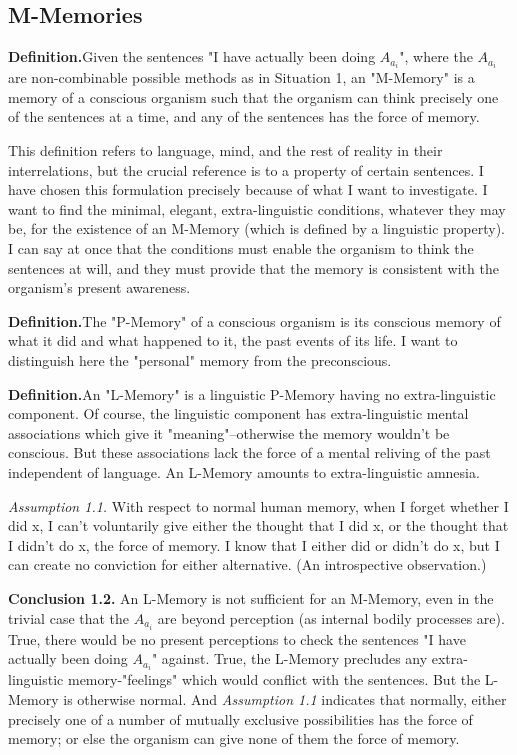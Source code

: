 \documentclass[10pt,twoside]{memoir}
\begin{document}
\begin{enumerate}
{\begin{enumerate}
\begin{sysrules}
\begin{sysrules}
\begin{sysrules}
\begin{sysrules}
\subsection{M-Memories}

\newcommand{\definition}{\textbf{Definition.}}
\newcommand{\assumption}[1]{\textit{Assumption #1.}}
\newcommand{\conclusion}[1]{\textbf{Conclusion #1.}}

\definition Given the sentences "I have actually been doing $A_{a_i}$", where 
the $A_{a_i}$ are non-combinable possible methods as in Situation 1, an 
"M-Memory" is a memory of a conscious organism such that the organism 
can think precisely one of the sentences at a time, and any of the sentences 
has the force of memory. 

This definition refers to language, mind, and the rest of reality in their 
interrelations, but the crucial reference is to a property of certain sentences. 
I have chosen this formulation precisely because of what I want to 
investigate. I want to find the minimal, elegant, extra-linguistic conditions, 
whatever they may be, for the existence of an M-Memory (which is defined 
by a linguistic property). I can say at once that the conditions must enable 
the organism to think the sentences at will, and they must provide that the 
memory is consistent with the organism's present awareness. 

\definition The "P-Memory" of a conscious organism is its conscious 
memory of what it did and what happened to it, the past events of its life. I 
want to distinguish here the "personal" memory from the preconscious. 

\definition An "L-Memory" is a linguistic P-Memory having no 
extra-linguistic component. Of course, the linguistic component has 
extra-linguistic mental associations which give it "meaning"--otherwise the 
memory wouldn't be conscious. But these associations lack the force of a 
mental reliving of the past independent of language. An L-Memory amounts 
to extra-linguistic amnesia. 

\assumption{1.1} With respect to normal human memory, when I forget 
whether I did x, I can't voluntarily give either the thought that I did x, or 
the thought that I didn't do x, the force of memory. I know that I either did 
or didn't do x, but I can create no conviction for either alternative. (An 
introspective observation.) 

\conclusion{1.2} An L-Memory is not sufficient for an M-Memory, even 
in the trivial case that the $A_{a_i}$ are beyond perception (as internal bodily 
processes are). True, there would be no present perceptions to check the 
sentences "I have actually been doing $A_{a_i}$" against. True, the L-Memory 
precludes any extra-linguistic memory-"feelings" which would conflict with 
the sentences. But the L-Memory is otherwise normal. And \textit{Assumption 1.1}
indicates that normally, either precisely one of a number of mutually 
exclusive possibilities has the force of memory; or else the organism can give 
none of them the force of memory. 


\end{sysrules}
\end{sysrules}
\end{sysrules}
\end{sysrules}
\end{enumerate}}
\end{enumerate}
\end{document}
